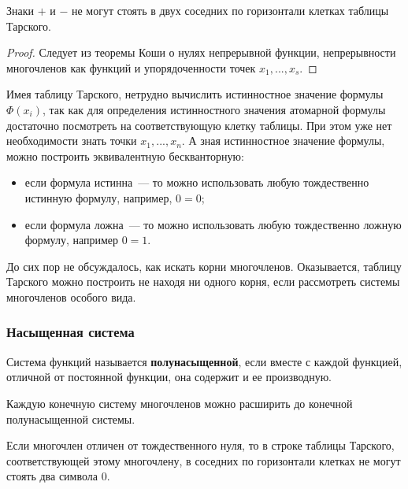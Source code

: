 \begin{proposal}
    Знаки $+$ и $-$ не могут стоять в двух соседних по горизонтали клетках таблицы Тарского.
\end{proposal}
\begin{proof}
    Следует из теоремы Коши о нулях непрерывной функции, непрерывности многочленов как функций и упорядоченности точек $x_1, ..., x_s$.
\end{proof}

Имея таблицу Тарского, нетрудно вычислить истинностное значение формулы $\Phi(x_i)$, так как для определения истинностного значения атомарной формулы достаточно посмотреть на соответствующую клетку таблицы. При этом уже нет необходимости знать точки $x_1, ..., x_n$. А зная истинностное значение формулы, можно построить эквивалентную бескванторную:
\begin{itemize}
    \item если формула истинна~--- то можно использовать любую тождественно истинную формулу, например, $0=0$;
    \item если формула ложна~--- то можно использовать любую тождественно ложную формулу, например $0=1$.
\end{itemize}

До сих пор не обсуждалось, как искать корни многочленов. Оказывается, таблицу Тарского можно построить не находя ни одного корня, если рассмотреть системы многочленов особого вида.

\subsubsection{Насыщенная система}

\begin{definition}\cite{lect1}
    Система функций называется \textbf{полунасыщенной}, если вместе с каждой функцией, отличной от постоянной функции, она содержит и ее производную.
\end{definition}

\begin{proposal}\cite{lect1}
    Каждую конечную систему многочленов можно расширить до конечной полунасыщенной системы.
\end{proposal}

\begin{proposal}\label{two zero}\cite{lect1}
    Если многочлен отличен от тождественного нуля, то в строке таблицы Тарского, соответствующей этому многочлену, в соседних по горизонтали клетках не могут стоять два символа 0.
\end{proposal}

